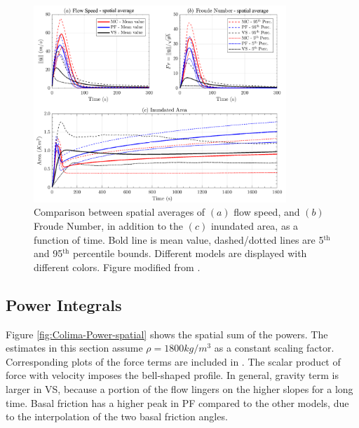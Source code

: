 \documentclass{article}
\begin{document}
\begin{figure}[H]
        \centering
        \includegraphics[width=0.85\textwidth]{AveragedColima.png}
        \caption{Comparison between spatial averages of $(a)$ flow speed, and $(b)$ Froude Number, in addition to the $(c)$ inundated area, as a function of time. Bold line is mean value, dashed/dotted lines are 5$^{\mathrm{th}}$ and 95$^{\mathrm{th}}$ percentile bounds. Different models are displayed with different colors. Figure modified from \cite{Patra2018b}.}
        \label{fig:Colima-spatial}
\end{figure}

\subsection{Power Integrals}
Figure \ref{fig:Colima-Power-spatial} shows the spatial sum of the powers. The estimates in this section assume $\rho = 1800 kg/m^3$ as a constant scaling factor. Corresponding plots of the force terms are included in \cite{Patra2018}. The scalar product of force with velocity imposes the bell-shaped profile. In general, gravity term is larger in VS, because a portion of the flow lingers on the higher slopes for a long time. Basal friction has a higher peak in PF compared to the other models, due to the interpolation of the two basal friction angles.
\end{document}

